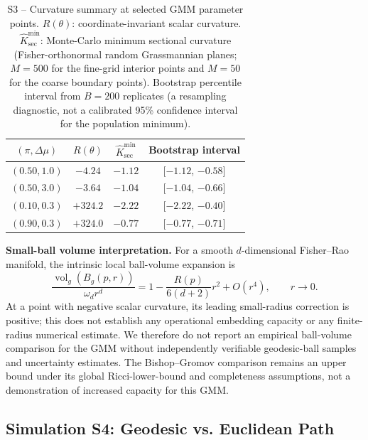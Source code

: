 \documentclass[a4paper,fleqn]{cas-dc}
\DeclareMathOperator{\vol}{vol}
\begin{document}
\begin{table}[ht]
  \centering
  \caption{S3 -- Curvature summary at selected GMM parameter points.
    $R(\theta)$: coordinate-invariant scalar curvature.
    $\widehat{K}_{\sec}^{\min}$: Monte-Carlo minimum sectional curvature
    (Fisher-orthonormal random Grassmannian planes; $M=500$ for the fine-grid
    interior points and $M=50$ for the coarse boundary points).
    Bootstrap percentile interval from $B=200$ replicates (a resampling diagnostic, not a calibrated 95\% confidence interval for the population minimum).}
  \label{tab:s3revised}
  \begin{tabular}{cccc}
    \toprule
    $(\pi, \Delta\mu)$ & $R(\theta)$ & $\widehat{K}_{\sec}^{\min}$ & Bootstrap interval \\
    \midrule
    $(0.50, 1.0)$ & $-4.24$ & $-1.12$ & [$-1.12$, $-0.58$] \\
    $(0.50, 3.0)$ & $-3.64$ & $-1.04$ & [$-1.04$, $-0.66$] \\
    $(0.10, 0.3)$ & $+324.2$ & $-2.22$ & [$-2.22$, $-0.40$] \\
    $(0.90, 0.3)$ & $+324.0$ & $-0.77$ & [$-0.77$, $-0.71$] \\
    \bottomrule
  \end{tabular}
\end{table}

\noindent\textbf{Small-ball volume interpretation.}
For a smooth $d$-dimensional Fisher--Rao manifold, the intrinsic local
ball-volume expansion is
\[
  \frac{\vol_g(B_g(p,r))}{\omega_d r^d}
  =1-\frac{R(p)}{6(d+2)}r^2+O(r^4),\qquad r\to0.
\]
At a point with negative scalar curvature, its leading small-radius
correction is positive; this does not establish any operational embedding
capacity or any finite-radius numerical estimate. We therefore do not
report an empirical ball-volume comparison for the GMM without
independently verifiable geodesic-ball samples and uncertainty estimates.
The Bishop--Gromov comparison remains an upper bound under its global
Ricci-lower-bound and completeness assumptions, not a demonstration of
increased capacity for this GMM.

\subsection{Simulation S4: Geodesic vs. Euclidean Path}
\label{sec:sim_s4}
\end{document}
